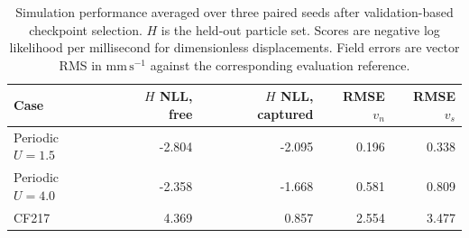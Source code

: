 \begin{table}[tbp]
\centering
\caption{Simulation performance averaged over three paired seeds after validation-based checkpoint selection. \(H\) is the held-out particle set. Scores are negative log likelihood per millisecond for dimensionless displacements. Field errors are vector RMS in \(\mathrm{mm\,s^{-1}}\) against the corresponding evaluation reference.}
\label{tab:latest-simulation-performance}
\begin{tabular}{@{}lrrrr@{}}
\toprule
Case & $H$ NLL, free & $H$ NLL, captured & RMSE $v_n$ & RMSE $v_s$ \\
\midrule
Periodic $U=1.5$ & -2.804 & -2.095 & 0.196 & 0.338 \\
Periodic $U=4.0$ & -2.358 & -1.668 & 0.581 & 0.809 \\
CF217 & 4.369 & 0.857 & 2.554 & 3.477 \\
\bottomrule
\end{tabular}
\end{table}

